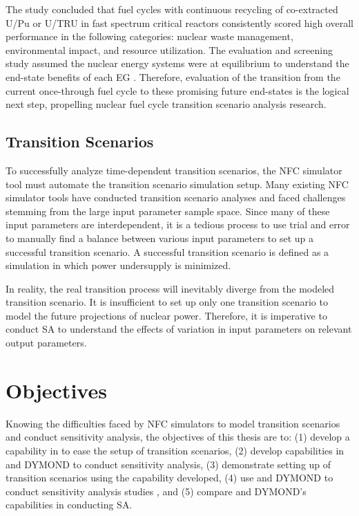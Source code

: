 The study concluded that fuel cycles with continuous recycling
of co-extracted U/Pu or U/TRU in fast spectrum critical reactors
consistently scored high overall performance in the following 
categories: nuclear waste management, environmental impact, 
and resource utilization. 
The evaluation and screening study assumed
the nuclear energy systems were at equilibrium to understand 
the end-state benefits of each \gls{EG} \cite{feng_standardized_2016}. 
Therefore, evaluation of the transition from the current 
once-through fuel cycle to these promising 
future end-states \cite{feng_standardized_2016} 
is the logical next step, propelling 
nuclear fuel cycle transition 
scenario analysis research. 

\subsection{Transition Scenarios}
To successfully analyze time-dependent transition
scenarios, the \gls{NFC} simulator tool must 
automate the transition scenario simulation setup. 
Many existing \gls{NFC} simulator tools have conducted 
transition scenario analyses \cite{feng_standardized_2016,bae_standardized_2019,coquelet-pascal_cosi6:_2015}
and faced challenges stemming from the large input parameter
sample space.
Since many of these input parameters are interdependent, it is 
a tedious process to use trial and error to manually find a balance 
between various input parameters to set up a successful transition 
scenario. 
A successful transition scenario is defined as a simulation in which 
power undersupply is minimized. 
 
In reality, the real transition process will 
inevitably diverge from the modeled transition scenario. 
It is insufficient to set up only one transition scenario to model 
the future projections of nuclear power.
Therefore, it is imperative to conduct \gls{SA} to understand 
the effects of variation in input parameters on 
relevant output parameters. 

\section{Objectives}
Knowing the difficulties faced by \gls{NFC} simulators to model 
transition scenarios and conduct sensitivity analysis, 
the objectives of this thesis are to: 
(1) develop a capability in \Cyclus to ease the setup of 
transition scenarios, 
(2) develop capabilities in \Cyclus and DYMOND to conduct 
sensitivity analysis,
(3) demonstrate setting up of \Cyclus transition scenarios using the 
capability developed,
(4) use \Cyclus and DYMOND to conduct sensitivity analysis studies
, and
(5) compare \Cyclus and DYMOND's capabilities in conducting \gls{SA}. 
